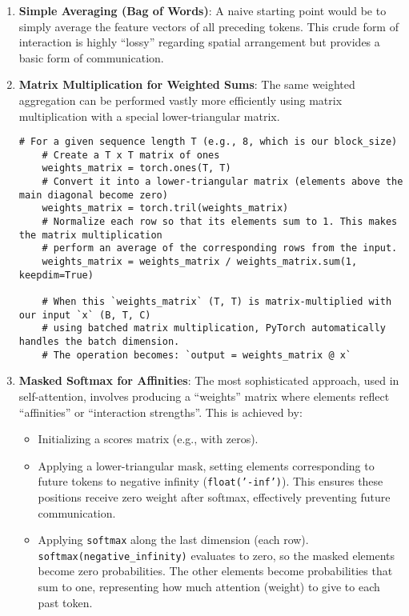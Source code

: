 \begin{enumerate}
    \item \textbf{Simple Averaging (Bag of Words)}: A naive starting point would be to simply average the feature vectors of all preceding tokens. This crude form of interaction is highly ``lossy'' regarding spatial arrangement but provides a basic form of communication.
    
    \item \textbf{Matrix Multiplication for Weighted Sums}: The same weighted aggregation can be performed vastly more efficiently using matrix multiplication with a special lower-triangular matrix.
    
    \begin{lstlisting}[caption={Efficient weighted aggregation using lower-triangular matrix}]
    # For a given sequence length T (e.g., 8, which is our block_size)
    # Create a T x T matrix of ones
    weights_matrix = torch.ones(T, T)
    # Convert it into a lower-triangular matrix (elements above the main diagonal become zero)
    weights_matrix = torch.tril(weights_matrix)
    # Normalize each row so that its elements sum to 1. This makes the matrix multiplication
    # perform an average of the corresponding rows from the input.
    weights_matrix = weights_matrix / weights_matrix.sum(1, keepdim=True)
    
    # When this `weights_matrix` (T, T) is matrix-multiplied with our input `x` (B, T, C)
    # using batched matrix multiplication, PyTorch automatically handles the batch dimension.
    # The operation becomes: `output = weights_matrix @ x`
    \end{lstlisting}

    \item \textbf{Masked Softmax for Affinities}: The most sophisticated approach, used in self-attention, involves producing a ``weights'' matrix where elements reflect ``affinities'' or ``interaction strengths''. This is achieved by:
    \begin{itemize}
        \item Initializing a scores matrix (e.g., with zeros).
        \item Applying a lower-triangular mask, setting elements corresponding to future tokens to negative infinity (\texttt{float('-inf')}). This ensures these positions receive zero weight after softmax, effectively preventing future communication.
        \item Applying \texttt{softmax} along the last dimension (each row). \texttt{softmax(negative\_infinity)} evaluates to zero, so the masked elements become zero probabilities. The other elements become probabilities that sum to one, representing how much attention (weight) to give to each past token.
    \end{itemize}
    

\end{enumerate}
